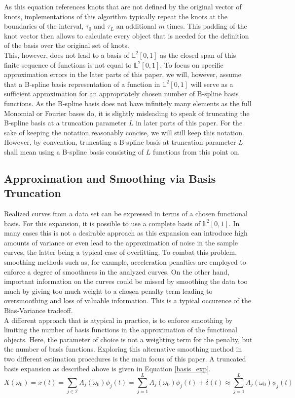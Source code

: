 \documentclass[11pt,twoside,a4paper]{article}
\begin{document}
	As this equation references knots that are not defined by the original vector of knots, implementations of this algorithm typically repeat the knots at the boundaries of the interval, $\tau_0$ and $\tau_L$ an additional $m$ times. This padding of the knot vector then allows to calculate every object that is needed for the definition of the basis over the original set of knots.\\	
	This, however, does not lead to a basis of $\mathbb{L}^2[0,1]$ as the closed span of this finite sequence of functions is not equal to $\mathbb{L}^2[0,1]$. To focus on specific approximation errors in the later parts of this paper, we will, however, assume that a B-spline basis representation of a function in $\mathbb{L}^2[0,1]$ will serve as a sufficient approximation for an appropriately chosen number of B-spline basis functions. 
	As the B-spline basis does not have infinitely many elements as the full Monomial or Fourier bases do, it is slightly misleading to speak of truncating the B-spline basis at a truncation parameter $L$ in later parts of this paper. For the sake of keeping the notation reasonably concise, we will still keep this notation. However, by convention, truncating a B-spline basis at truncation parameter $L$ shall mean using a B-spline basis consisting of $L$ functions from this point on.
	
	\subsection{Approximation and Smoothing via Basis Truncation}
	Realized curves from a data set can be expressed in terms of a chosen functional basis. For this expansion, it is  possible to use a complete basis of $\mathbb{L}^2[0,1]$. In many cases this is not a desirable approach as this expansion can introduce high amounts of variance or even lead to the approximation of noise in the sample curves, the latter being a typical case of overfitting. To combat this problem, smoothing methods such as, for example, acceleration penalties are employed to enforce a degree of smoothness in the analyzed curves. On the other hand, important information on the curves could be missed by smoothing the data too much by giving too much weight to a chosen penalty term leading to oversmoothing and loss of valuable information. This is a typical occurence of the Bias-Variance tradeoff.\\
	
	A different approach that is atypical in practice, is to enforce smoothing by limiting the number of basis functions in the approximation of the functional objects. Here, the parameter of choice is not a weighting term for the penalty, but the number of basis functions. Exploring this alternative smoothing method in two different estimation procedures is the main focus of this paper. A truncated basis expansion as described above is given in Equation \ref{basis_exp}.
	\begin{equation}\label{basis_exp}
		X(\omega_0) = x(t) = \sum_{j \in \mathcal{I}} A_j(\omega_0) \phi_j(t) = \sum_{j = 1}^{L} A_j(\omega_0) \phi_j(t) + \delta(t) \approx \sum_{j = 1}^{L} A_j(\omega_0) \phi_j(t)
	\end{equation}
\end{document}
